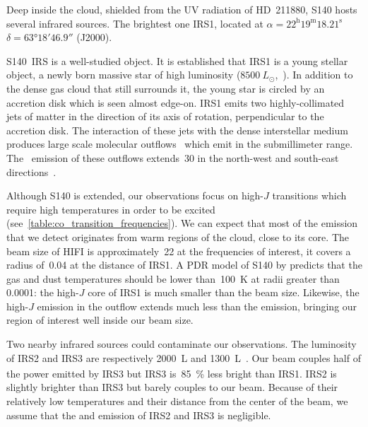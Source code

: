 Deep inside the cloud, shielded from the UV radiation of HD~211880, S140 hosts several infrared sources.
The brightest one IRS1, located at $\alpha = 22^\text{h} 19^\text{m} 18.21^\text{s}$ $\delta = \ang{63;18;46.9}$ (J2000).

S140~IRS is a well-studied object.
It is established that IRS1 is a young stellar object, a newly born massive star of high luminosity ($\SI{8500}{L_\odot}$,~\cite{maud2013s140}).
In addition to the dense gas cloud that still surrounds it, the young star is circled by an accretion disk which is seen almost edge-on.
IRS1 emits two highly-collimated jets of matter in the direction of its axis of rotation, perpendicular to the accretion disk.
The interaction of these jets with the dense interstellar medium produces large scale molecular outflows~\parencite{reipurth2001herbig} which emit in the submillimeter range.
The~ emission of these outflows extends~\SI{30}{\arcsec} in the north-west and south-east directions~\parencite{maud2013s140}.

Although S140 is extended, our observations focus on high-$J$ transitions which require high temperatures in order to be excited (see~\cref{table:co_transition_frequencies}).
We can expect that most of the emission that we detect originates from warm regions of the cloud, close to its core.
The beam size of HIFI is approximately~\SI{22}{\arcsec} at the frequencies of interest,
it covers a radius of~\SI{0.04}{\parsec} at the distance of IRS1.
A PDR model of S140 by \textcite{koumpia2015} predicts that the gas and dust temperatures should be lower than~\SI{100}{\kelvin} at radii greater than \SI{0.0001}{\parsec}: the high-$J$  core of IRS1 is much smaller than the beam size.
Likewise, the high-$J$  emission in the outflow extends much less than the  emission, bringing our region of interest well inside our beam size.

Two nearby infrared sources could contaminate our observations.
The luminosity of IRS2 and IRS3 are respectively \SI{2000}{L_\odot} and \SI{1300}{L_\odot}~\parencite{koumpia2015}.
Our beam couples half of the power emitted by IRS3 but IRS3 is~\SI{85}{\percent} less bright than IRS1.
IRS2 is slightly brighter than IRS3 but barely couples to our beam.
Because of their relatively low temperatures and their distance from the center of the beam, we assume that the  and  emission of IRS2 and IRS3 is negligible.


